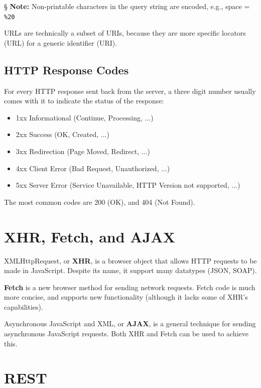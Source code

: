 \documentclass{report}
\newcommand{\npar}{\par\noindent}
\newcommand{\vpar}{\vspace{1em}\npar}
\newcommand{\nnote}{\npar \S \textbf{ Note: }}
\begin{document}
\nnote Non-printable characters in the query string are encoded, e.g., space = \verb|%20|

\vpar URLs are technically a subset of URIs, because they are more specific locators (URL) for a generic identifier (URI).

\subsection{HTTP Response Codes}

\par For every HTTP response sent back from the server, a three digit number usually comes with it to indicate the status of the response:

\begin{itemize}
    \item 1xx Informational (Continue, Processing, ...)
    \item 2xx Success (OK, Created, ...)
    \item 3xx Redirection (Page Moved, Redirect, ...)
    \item 4xx Client Error (Bad Request, Unauthorized, ...)
    \item 5xx Server Error (Service Unavailable, HTTP Version not supported, ...)
\end{itemize}

\npar The most common codes are 200 (OK), and 404 (Not Found).

\section{XHR, Fetch, and AJAX}

\par XMLHttpRequest, or \textbf{XHR}, is a browser object that allows HTTP requests to be made in JavaScript. Despite its name, it support many datatypes (JSON, SOAP).

\vpar \textbf{Fetch} is a new browser method for sending network requests. Fetch code is much more concise, and supports new functionality (although it lacks some of XHR's capabilities).

\vpar Asynchronous JavaScript and XML, or \textbf{AJAX}, is a general technique for sending asynchronous JavaScript requests. Both XHR and Fetch can be used to achieve this.

\section{REST}
\end{document}
